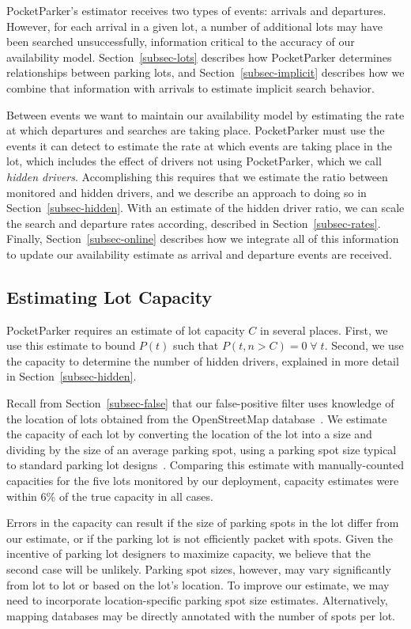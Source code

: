 PocketParker's estimator receives two types of events: arrivals and
departures. However, for each arrival in a given lot, a number of additional
lots may have been searched unsuccessfully, information critical to the
accuracy of our availability model. Section~\ref{subsec-lots} describes how
PocketParker determines relationships between parking lots, and
Section~\ref{subsec-implicit} describes how we combine that information with
arrivals to estimate implicit search behavior.

Between events we want to maintain our availability model by estimating the
rate at which departures and searches are taking place. PocketParker must use
the events it can detect to estimate the rate at which events are taking
place in the lot, which includes the effect of drivers not using
PocketParker, which we call \textit{hidden drivers}. Accomplishing this
requires that we estimate the ratio between monitored and hidden drivers, and
we describe an approach to doing so in Section~\ref{subsec-hidden}. With an
estimate of the hidden driver ratio, we can scale the search and departure
rates according, described in Section~\ref{subsec-rates}. Finally,
Section~\ref{subsec-online} describes how we integrate all of this
information to update our availability estimate as arrival and departure
events are received.

\subsection{Estimating Lot Capacity}
\label{subsec-capacity}

PocketParker requires an estimate of lot capacity $C$ in several places.
First, we use this estimate to bound $P(t)$ such that $P(t, n > C) =
0\;\forall\;t$. Second, we use the capacity to determine the number of hidden
drivers, explained in more detail in Section~\ref{subsec-hidden}.

Recall from Section~\ref{subsec-false} that our false-positive filter uses knowledge
of the location of lots obtained from the OpenStreetMap
database~\cite{openstreetmap}. We estimate the capacity of each lot by converting the
location of the lot into a size and dividing by the size of an average
parking spot, using a parking spot size typical to standard parking lot
designs~\cite{parkingdesign}. Comparing this estimate with manually-counted
capacities for the five lots monitored by our deployment, capacity estimates
were within 6\% of the true capacity in all cases.

Errors in the capacity can result if the size of parking spots in the lot
differ from our estimate, or if the parking lot is not efficiently packet
with spots. Given the incentive of parking lot designers to maximize
capacity, we believe that the second case will be unlikely. Parking spot
sizes, however, may vary significantly from lot to lot or based on the lot's
location. To improve our estimate, we may need to incorporate
location-specific parking spot size estimates. Alternatively, mapping
databases may be directly annotated with the number of spots per lot.

